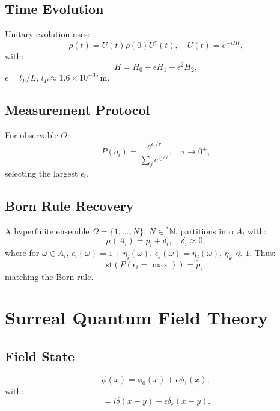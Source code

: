 \documentclass{article}
\begin{document}
\subsection{Time Evolution}
Unitary evolution uses:
\begin{equation}
\rho(t) = U(t) \rho(0) U^\dagger(t), \quad U(t) = e^{-i H t},
\end{equation}
with:
\begin{equation}
H = H_0 + \epsilon H_1 + \epsilon^2 H_2,
\end{equation}
\(\epsilon = l_P / L\), \(l_P \approx 1.6 \times 10^{-35} \, \text{m}\).

\subsection{Measurement Protocol}
For observable \(O\):
\begin{equation}
P(o_i) = \frac{e^{\epsilon_i / \tau}}{\sum_j e^{\epsilon_j / \tau}}, \quad \tau \to 0^+,
\end{equation}
selecting the largest \(\epsilon_i\).

\subsection{Born Rule Recovery}
A hyperfinite ensemble \(\Omega = \{1, \dots, N\}\), \(N \in {}^*\mathbb{N}\), partitions into \(A_i\) with:
\begin{equation}
\mu(A_i) = p_i + \delta_i, \quad \delta_i \approx 0,
\end{equation}
where for \(\omega \in A_i\), \(\epsilon_i(\omega) = 1 + \eta_i(\omega)\), \(\epsilon_j(\omega) = \eta_j(\omega)\), \(\eta_k \ll 1\). Thus:
\begin{equation}
\text{st}(P(\epsilon_i = \max)) = p_i,
\end{equation}
matching the Born rule.

\section{Surreal Quantum Field Theory}
\subsection{Field State}
\begin{equation}
\phi(x) = \phi_0(x) + \epsilon \phi_1(x),
\end{equation}
with:
\begin{equation}
[\phi(x), \pi(y)] = i \delta(x-y) + \epsilon \delta_\epsilon(x-y).
\end{equation}
\end{document}
